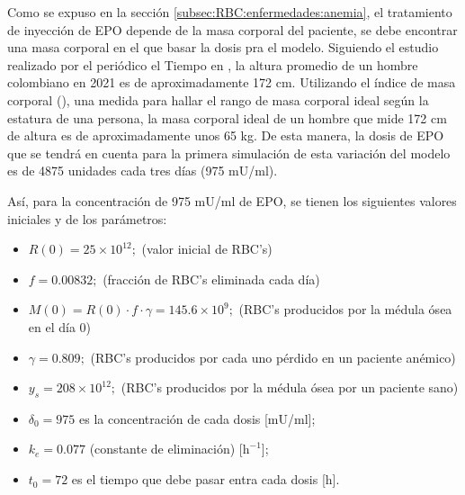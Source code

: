Como se expuso en la sección \ref{subsec:RBC:enfermedades:anemia}, el tratamiento de inyección de EPO depende de la masa corporal del paciente, se debe encontrar una masa corporal en el que basar la dosis pra el modelo. Siguiendo el estudio realizado por el periódico el Tiempo en \cite{elTiempo}, la altura promedio de un hombre colombiano en 2021 es de aproximadamente 172 cm. Utilizando el índice de masa corporal (\cite{IMC}), una medida para hallar el rango de masa corporal ideal según la estatura de una persona, la masa corporal ideal de un hombre que mide 172 cm de altura es de aproximadamente unos 65 kg. De esta manera, la dosis de EPO que se tendrá en cuenta para la primera simulación de esta variación del modelo es de 4875 unidades cada tres días (975 mU/ml).

Así, para la concentración de 975 mU/ml de EPO, se tienen los siguientes valores iniciales y de los parámetros:

\begin{itemize}
    \item $R(0) = 25\times 10^{12};$ (valor inicial de RBC's)
    \item $f=0.00832;$ (fracción de RBC's eliminada cada día)
    \item $M(0) = R(0)\cdot f \cdot \gamma = 145.6\times 10^{9};$ (RBC's producidos por la médula ósea en el día 0)
    \item $\gamma = 0.809;$ (RBC's producidos por cada uno pérdido en un paciente anémico) 
    \item $y_s = 208\times 10^{12};$ (RBC's producidos por la médula ósea por un paciente sano)
    \item $\delta_0=975$ es la concentración de cada dosis [mU/ml];
    \item $k_e=0.077$ (constante de eliminación) [$\textrm{h}^{-1}$];
    \item $t_0=72$ es el tiempo que debe pasar entra cada dosis [h].
\end{itemize}

